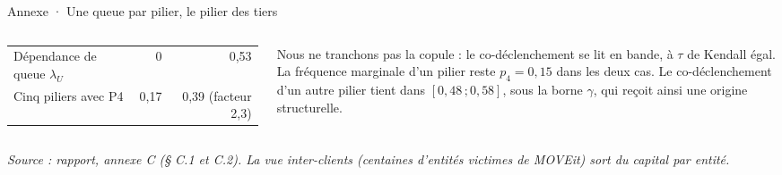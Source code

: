 \documentclass[aspectratio=169,10pt,t]{beamer}
\newcommand{\source}[1]{\par\vfill{\tiny\color{gris}\textit{Source : #1}}\par\vspace{-1mm}}
\begin{document}
\begin{frame}{Annexe · Une queue par pilier, le pilier des tiers}
\begin{columns}[T,onlytextwidth]
\begin{tabularx}{\linewidth}{@{}Y r r@{}}
      \midrule
      Dépendance de queue $\lambda_U$ & 0 & 0,53 \\
      Cinq piliers avec P4 & 0,17 & 0,39 (facteur 2,3) \\
      \bottomrule
    \end{tabularx}\par\vspace{1.5mm}
    Nous ne tranchons pas la copule : le co-déclenchement se lit en bande, à $\tau$ de Kendall égal. La fréquence marginale d'un pilier reste $p_4=0{,}15$ dans les deux cas. Le co-déclenchement d'un autre pilier tient dans $[0{,}48\,;0{,}58]$, sous la borne $\gamma$, qui reçoit ainsi une origine structurelle.
  \end{columns}
  \source{rapport, annexe C (§ C.1 et C.2). La vue inter-clients (centaines d'entités victimes de MOVEit) sort du capital par entité.}
\end{frame}
\end{document}
